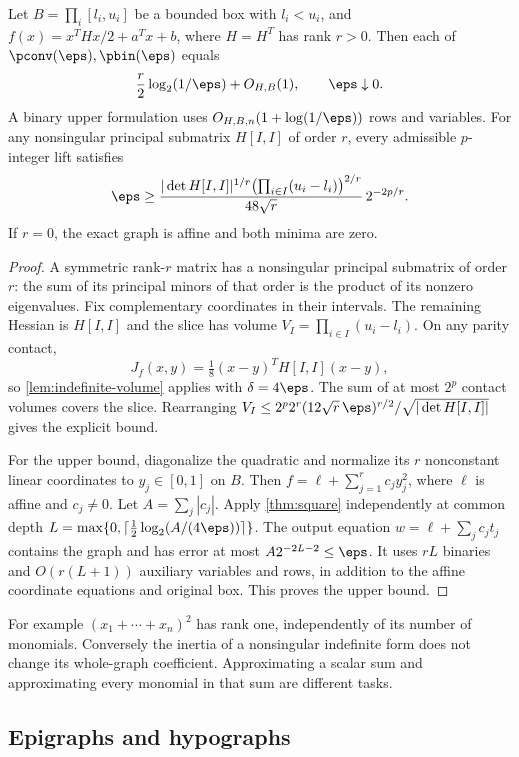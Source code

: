 \begin{theorem}\label{thm:scalar-rank}
Let $B=\prod_i[l_i,u_i]$ be a bounded box with $l_i<u_i$, and
$f(x)=x^THx/2+a^Tx+b$, where $H=H^T$ has rank $r>0$.
Then each of $\pconv(\eps),\pbin(\eps)$ equals
\begin{equation}\label{eq:scalar-law}
 \frac r2\log_2(1/\eps)+O_{H,B}(1),\qquad\eps\downarrow0.
\end{equation}
A binary upper formulation uses $O_{H,B,n}(1+\log(1/\eps))$ rows and
variables. For any nonsingular principal submatrix $H[I,I]$ of order
$r$, every admissible $p$-integer lift satisfies
\[
 \eps\ge
 \frac{|\det H[I,I]|^{1/r}\bigl(\prod_{i\in I}(u_i-l_i)\bigr)^{2/r}}
      {48\sqrt r}\,2^{-2p/r}.
\]
If $r=0$, the exact graph is affine and both minima are zero.
\end{theorem}
\begin{proof}
A symmetric rank-$r$ matrix has a nonsingular principal submatrix of
order $r$: the sum of its principal minors of that order is the product
of its nonzero eigenvalues. Fix complementary coordinates in their
intervals. The remaining Hessian is $H[I,I]$ and the slice has volume
$V_I=\prod_{i\in I}(u_i-l_i)$. On any parity contact,
\[
 J_f(x,y)=\tfrac18(x-y)^TH[I,I](x-y),
\]
so \cref{lem:indefinite-volume} applies with $\delta=4\eps$.
The sum of at most $2^p$ contact volumes covers the slice. Rearranging
$V_I\le2^p2^r(12\sqrt r\,\eps)^{r/2}/\sqrt{|\det H[I,I]|}$
gives the explicit bound.

For the upper bound, diagonalize the quadratic and normalize its $r$
nonconstant linear coordinates to $y_j\in[0,1]$ on $B$. Then
$f=\ell+\sum_{j=1}^r c_jy_j^2$, where $\ell$ is affine and $c_j\ne0$.
Let $A=\sum_j|c_j|$. Apply \cref{thm:square} independently at common
depth $L=\max\{0,\lceil\tfrac12\log_2(A/(4\eps))\rceil\}$.
The output equation $w=\ell+\sum_jc_jt_j$ contains the graph and has
error at most $A2^{-2L-2}\le\eps$. It uses $rL$ binaries and
$O(r(L+1))$ auxiliary variables and rows, in addition to the affine
coordinate equations and original box. This proves the upper bound.
\end{proof}

For example $(x_1+\cdots+x_n)^2$ has rank one, independently of its
number of monomials. Conversely the inertia of a nonsingular indefinite
form does not change its whole-graph coefficient. Approximating a scalar
sum and approximating every monomial in that sum are different tasks.

\subsection{Epigraphs and hypographs}

